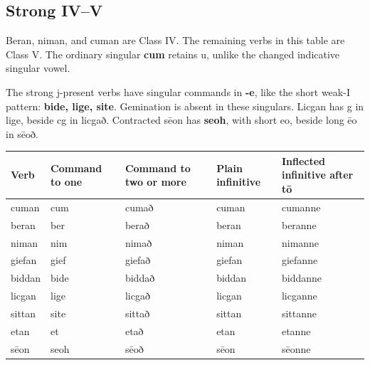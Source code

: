 \subsection*{Strong IV–V}

Beran, niman, and cuman are Class IV. The remaining verbs in this table are Class V. The ordinary singular \textbf{cum} retains u, unlike the changed indicative singular vowel.

The strong j-present verbs have singular commands in \textbf{-e}, like the short weak-I pattern: \textbf{bide, lige, site}. Gemination is absent in these singulars. Licgan has g in lige, beside cg in licgað. Contracted sēon has \textbf{seoh}, with short eo, beside long ēo in sēoð.

\par\begingroup
\fontsize{10.5}{13.2}\selectfont
\setlength{\LTleft}{0pt}\setlength{\LTright}{\fill}
\noindent
\begin{tabular}{@{}>{\raggedright\arraybackslash}p{17.31mm}>{\raggedright\arraybackslash}p{17.57mm}>{\raggedright\arraybackslash}p{23.8mm}>{\raggedright\arraybackslash}p{21.98mm}>{\raggedright\arraybackslash}p{32.1mm}@{}}
\toprule
\textbf{Verb} & \textbf{Command to one} & \textbf{Command to two or more} & \textbf{Plain infinitive} & \textbf{Inflected infinitive after tō} \\
\midrule
cuman & cum & cumað & cuman & cumanne \\
beran & ber & berað & beran & beranne \\
niman & nim & nimað & niman & nimanne \\
giefan & gief & giefað & giefan & giefanne \\
biddan & bide & biddað & biddan & biddanne \\
licgan & lige & licgað & licgan & licganne \\
sittan & site & sittað & sittan & sittanne \\
etan & et & etað & etan & etanne \\
sēon & seoh & sēoð & sēon & sēonne \\
\bottomrule
\end{tabular}
\par\endgroup

